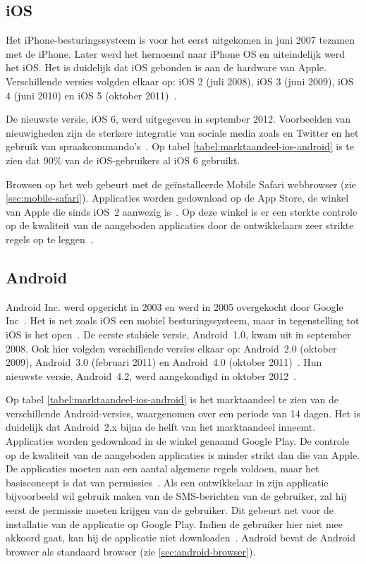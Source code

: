 \subsection{iOS}
Het iPhone-besturingssysteem is voor het eerst uitgekomen in juni 2007 tezamen met de iPhone. 
Later werd het hernoemd naar iPhone OS en uiteindelijk werd het iOS. 
Het is duidelijk dat iOS gebonden is aan de hardware van Apple. 
Verschillende versies volgden elkaar op: iOS 2 (juli 2008), iOS 3 (juni 2009), iOS 4 (juni 2010) en iOS 5 (oktober 2011)~\cite{Deitel2012, PhilDutson2012}. 

De nieuwste versie, iOS 6, werd uitgegeven in september 2012. 
Voorbeelden van nieuwigheden zijn de sterkere integratie van sociale media zoals \fb{} en Twitter en het gebruik van spraakcommando's~\cite{Deitel2012}. 
Op tabel \ref{tabel:marktaandeel-ios-android} is te zien dat 90\% van de iOS-gebruikers al iOS 6 gebruikt.

Browsen op het web gebeurt met de geïnstalleerde Mobile Safari webbrowser (zie \ref{sec:mobile-safari}). 
Applicaties worden gedownload op de App Store, de winkel van Apple die sinds iOS~2 aanwezig is~\cite{Deitel2012}. 
Op deze winkel is er een sterkte controle op de kwaliteit van de aangeboden applicaties door de ontwikkelaars zeer strikte regels op te leggen~\cite{Apple2010a}.

\subsection{Android}
Android Inc. werd opgericht in 2003 en werd in 2005 overgekocht door Google Inc~\cite{Satyesh2012}. 
Het is net zoals iOS een mobiel besturingssysteem, maar in tegenstelling tot iOS is het open~\cite{David2011}. 
De eerste stabiele versie, Android~1.0, kwam uit in september 2008. 
Ook hier volgden verschillende versies elkaar op: Android~2.0 (oktober 2009), Android~3.0 (februari 2011) en Android~4.0 (oktober 2011)~\cite{Satyesh2012}. 
Hun nieuwste versie, Android~4.2, werd aangekondigd in oktober 2012~\cite{Sawers2012}. 

Op tabel \ref{tabel:marktaandeel-ios-android} is het marktaandeel te zien van de verschillende Android-versies, waargenomen over een periode van 14 dagen. 
Het is duidelijk dat Android~2.x bijna de helft van het marktaandeel inneemt.
Applicaties worden gedownload in de winkel genaamd Google Play. 
De controle op de kwaliteit van de aangeboden applicaties is minder strikt dan die van Apple.
De applicaties moeten aan een aantal algemene regels voldoen, maar het basisconcept is dat van permissies~\cite{Android2013b}.
Als een ontwikkelaar in zijn applicatie bijvoorbeeld wil gebruik maken van de SMS-berichten van de gebruiker, zal hij eerst de permissie moeten krijgen van de gebruiker.
Dit gebeurt net voor de installatie van de applicatie op Google Play.
Indien de gebruiker hier niet mee akkoord gaat, kan hij de applicatie niet downloaden~\cite{Android2013a}.
Android bevat de Android browser als standaard browser (zie \ref{sec:android-browser}).

